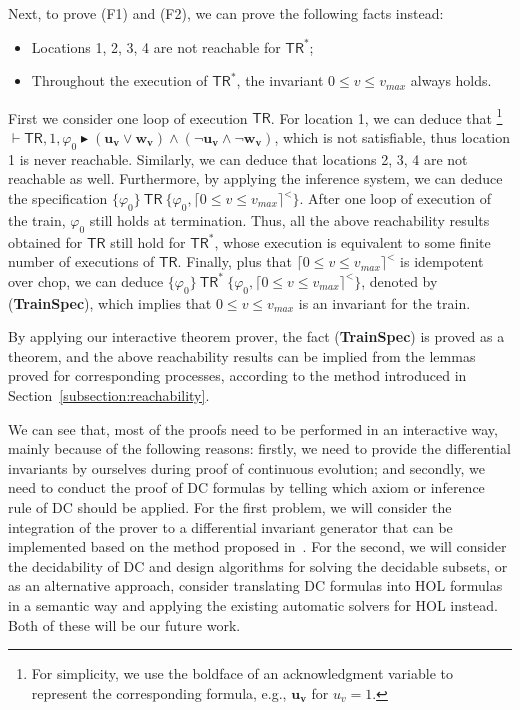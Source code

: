 \documentclass{llncs}
\newcommand{\typeb}[2]{\vdash #1 \blacktriangleright #2}
\newcommand{\inference}[3]{\{#1\} \ #2\ \{#3\}}
\newcommand{\Pre}{\varphi}
\begin{document}
Next, to prove (F1) and (F2), we can prove the following facts instead:
\begin{itemize}
\item Locations 1, 2, 3, 4 are not reachable for $\textsf{TR}^*$;
\item Throughout the execution of $\textsf{TR}^*$,
the invariant $ 0 \leq v \leq v_{max}$ always holds.
\end{itemize}
First we consider one loop of execution $\textsf{TR}$.
For location 1, we can deduce that \footnote{For simplicity, we use the boldface of an acknowledgment  variable to represent the corresponding
  formula, e.g., $\textbf{u}_\textbf{v}$ for $u_v=1$.}
$\typeb{\textsf{TR}, 1, \Pre_0} {(\textbf{u}_\textbf{v} \vee \textbf{w}_\textbf{v}) \wedge (\neg \textbf{u}_\textbf{v} \wedge \neg \textbf{w}_\textbf{v})}$, which
is not satisfiable, thus location 1 is never  reachable.
Similarly, we can deduce that locations 2, 3, 4 are not reachable as well.  Furthermore, by applying the inference system, we can deduce the  specification
$\inference{\Pre_0}{\textsf{TR}}{\Pre_0, \lceil 0 \leq v \leq v_{max} \rceil^<} $.
After one loop  of execution of the train, $\Pre_0$ still holds at termination. Thus,
all the above reachability  results obtained for $\textsf{TR}$ still hold for $\textsf{TR}^*$,  whose execution
is equivalent to some  finite number of executions of  $\textsf{TR}$.
Finally, plus that $\lceil 0 \leq v \leq v_{max} \rceil^<$ is idempotent over chop, we
can deduce
$\inference{\Pre_0}{\textsf{TR}^*}{\Pre_0, \lceil 0 \leq v \leq v_{max} \rceil^<}$, denoted by (\textbf{TrainSpec}),
which
implies that $0 \leq v \leq v_{max}$ is an invariant for the train.

By applying  our interactive theorem prover, the fact (\textbf{TrainSpec}) is proved as a theorem, and
the above reachability results can be implied from the lemmas proved for corresponding processes, according to
the method introduced in Section~\ref{subsection:reachability}.

We can see that, most of the proofs need to be performed in an interactive way,
mainly because of the following reasons: firstly, we need to provide the differential invariants by ourselves during proof
of continuous evolution; and
secondly, we need to conduct the proof of DC formulas by telling
which axiom or inference rule of DC should be applied.  For the first problem, we will consider
the integration of the prover to a differential invariant generator that can be implemented based on the method
proposed in~\cite{LZZ11}. For the second, we will consider  the decidability
of DC and design algorithms for solving the decidable subsets, or as an alternative approach,
consider translating DC formulas into HOL formulas in a semantic way and
applying the existing automatic solvers for HOL instead. Both of these will be our future work.
\end{document}
